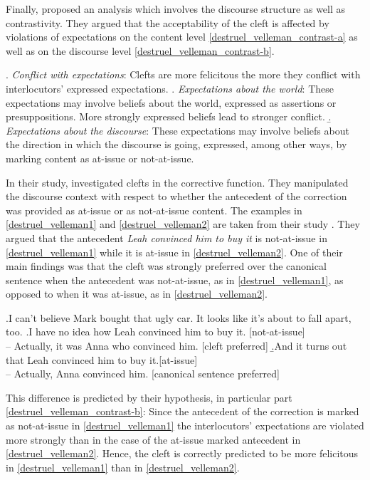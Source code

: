\documentclass{salt}
\begin{document}
Finally, \cite{destruel_velleman_2014} proposed an analysis which involves the discourse structure as well as contrastivity. They argued that the acceptability of the cleft is affected by violations of expectations on the content level \ref{destruel_velleman_contrast-a} as well as on the discourse level \ref{destruel_velleman_contrast-b}.

\ex.\label{destruel_velleman_contrast} \textit{Conflict with expectations}: Clefts are more felicitous the more they conflict with interlocutors' expressed expectations.
\a.\label{destruel_velleman_contrast-a} \textit{Expectations about the world}: These expectations may involve beliefs about the world, expressed as assertions or presuppositions. More strongly expressed beliefs lead to stronger conflict.
\b.\label{destruel_velleman_contrast-b} \textit{Expectations about the discourse}: These expectations may involve beliefs about the direction in which the discourse is going, expressed, among other ways, by marking content as at-issue or not-at-issue.\\
\textcolor{white}{}\hfill\cite[199]{destruel_velleman_2014}

In their study, \cite{destruel_velleman_2014} investigated clefts in the corrective function. They manipulated the discourse context with respect to whether the antecedent of the correction was provided as at-issue or as not-at-issue content. The examples in \ref{destruel_velleman1} and \ref{destruel_velleman2} are taken from their study \cite[][212--213]{destruel_velleman_2014}. They argued that the antecedent \textit{Leah convinced him to buy it} is not-at-issue in \ref{destruel_velleman1} while it is at-issue in \ref{destruel_velleman2}. One of their main findings was that the cleft was strongly preferred over the canonical sentence when the antecedent was not-at-issue, as in \ref{destruel_velleman1}, as opposed to when it was at-issue, as in \ref{destruel_velleman2}.

\ex.I can't believe Mark bought that ugly car. It looks like it's about to fall apart, too. 
\a.\label{destruel_velleman1}I have no idea how Leah convinced him to buy it. \hfill[not-at-issue]\\
-- Actually, it was Anna who convinced him. \hfill[cleft preferred]
\b.\label{destruel_velleman2}And it turns out that Leah convinced him to buy it.\hfill[at-issue] \\
-- Actually, Anna convinced him. \hfill[canonical sentence preferred]

This difference is predicted by their hypothesis, in particular part \ref{destruel_velleman_contrast-b}: Since the antecedent of the correction is marked as not-at-issue in \ref{destruel_velleman1} the interlocutors' expectations are violated more strongly than in the case of the at-issue marked antecedent in \ref{destruel_velleman2}. Hence, the cleft is correctly predicted to be more felicitous in \ref{destruel_velleman1} than in \ref{destruel_velleman2}. 
\end{document}
